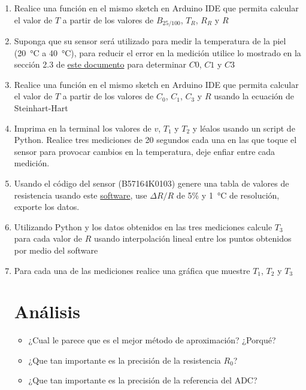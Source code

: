 \begin{enumerate}
\begin{equation*}
    \dfrac{1}{T}=\dfrac{1}{T_R} + \dfrac{1}{B_{25/100}} \ln{\left( \dfrac{R}{R_R} \right)}
\end{equation*}
donde $T$ es la temperatura del termistor en \si{\kelvin}, $T_R$ es la temperatura de referencia en \si{\kelvin} y $R_R$ es la resistencia de referencia en \si{\ohm}
\item Realice una función en el mismo sketch en Arduino IDE que permita calcular el valor de $T$ a partir de los valores de $B_{25/100}$, $T_R$, $R_R$ y $R$
\item Suponga que su sensor será utilizado para medir la temperatura de la piel (\SI{20}{\celsius} a \SI{40}{\celsius}), para reducir el error en la medición utilice lo mostrado en la sección 2.3 de \href{https://www.tdk-electronics.tdk.com/download/2999750/740594dd4ec109808826d1b5c774b3f6/ntc-thermistors-readout-trimming-an.pdf}{este documento} para determinar $C0$, $C1$ y $C3$
\item Realice una función en el mismo sketch en Arduino IDE que permita calcular el valor de $T$ a partir de los valores de $C_0$, $C_1$, $C_3$ y $R$ usando la ecuación de Steinhart-Hart
\item Imprima en la terminal los valores de $v$, $T_1$ y $T_2$ y léalos usando un script de Python. Realice tres mediciones de 20 segundos cada una en las que toque el sensor para provocar cambios en la temperatura, deje enfiar entre cada medición. 
\item Usando el código del sensor (B57164K0103) genere una tabla de valores de resistencia usando este \href{https://tools.tdk-electronics.tdk.com/ntc/}{software}, use $\Delta R / R$ de 5\% y \SI{1}{\celsius} de resolución, exporte los datos.
\item Utilizando Python y los datos obtenidos en las tres mediciones calcule $T_3$ para cada valor de $R$ usando interpolación lineal entre los puntos obtenidos por medio del software 
\item Para cada una de las mediciones realice una gráfica que muestre $T_1$, $T_2$ y $T_3$
\section{Análisis}
\begin{itemize}
    \item ¿Cual le parece que es el mejor método de aproximación? ¿Porqué?
    \item ¿Que tan importante es la precisión de la resistencia $R_0$?
    \item ¿Que tan importante es la precisión de la referencia del ADC?
\end{itemize}

\end{enumerate}